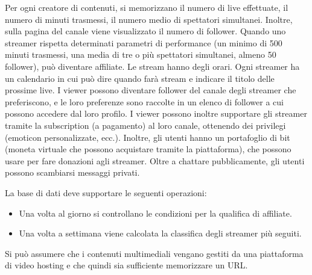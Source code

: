 Per ogni creatore di contenuti, si memorizzano il numero di live effettuate, il numero di minuti
trasmessi, il numero medio di spettatori simultanei. Inoltre, sulla pagina del canale viene
visualizzato il numero di follower.
Quando uno streamer rispetta determinati parametri di performance (un minimo di 500 minuti
trasmessi, una media di tre o più spettatori simultanei, almeno 50 follower), può diventare affiliate.
Le stream hanno degli orari. Ogni streamer ha un calendario in cui può dire quando farà stream e
indicare il titolo delle prossime live.
I viewer possono diventare follower del canale degli streamer che preferiscono, e le loro
preferenze sono raccolte in un elenco di follower a cui possono accedere dal loro profilo. I viewer
possono inoltre supportare gli streamer tramite la subscription (a pagamento) al loro canale,
ottenendo dei privilegi (emoticon personalizzate, ecc.). Inoltre, gli utenti hanno un portafoglio di bit
(moneta virtuale che possono acquistare tramite la piattaforma), che possono usare per fare
donazioni agli streamer.
Oltre a chattare pubblicamente, gli utenti possono scambiarsi messaggi privati.

La base di dati deve supportare le seguenti operazioni:
\begin{itemize}
    \item Una volta al giorno si controllano le condizioni per la qualifica di affiliate.
    \item Una volta a settimana viene calcolata la classifica degli streamer più seguiti.
\end{itemize}
Si può assumere che i contenuti multimediali vengano gestiti da una piattaforma di video hosting e
che quindi sia sufficiente memorizzare un URL.
\restoregeometry




